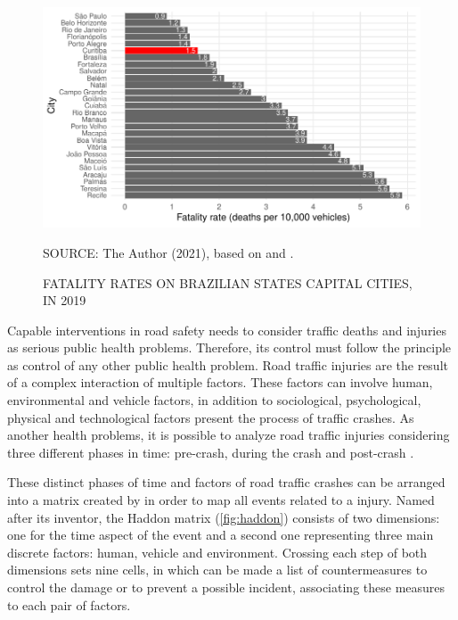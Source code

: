 \begin{figure}[!htbp]
    \centering\footnotesize
    \captionsetup{font=footnotesize}
    \caption{FATALITY RATES ON BRAZILIAN STATES CAPITAL CITIES, IN 2019}
    \includegraphics{fig/cap_fatal.pdf}
    \label{fig:cap_fatal}
    \par SOURCE: The Author (2021), based on \textcite{MinistryofHealth2020} and \textcite{DENATRAN2020}.
\end{figure} 

Capable interventions in road safety needs to consider traffic deaths and injuries as serious public health problems. Therefore, its control must follow the principle as control of any other public health problem. Road traffic injuries are the result of a complex interaction of multiple factors. These factors can involve human, environmental and vehicle factors, in addition to sociological, psychological, physical and technological factors present the process of traffic crashes. As another health problems, it is possible to analyze road traffic injuries considering three different phases in time: pre-crash, during the crash and post-crash \cite{Mohan2016}.

These distinct phases of time and factors of road traffic crashes can be arranged into a matrix created by \textcite{Haddon1980} in order to map all events related to a injury. Named after its inventor, the Haddon matrix (\autoref{fig:haddon}) consists of two dimensions: one for the time aspect of the event and a second one representing three main discrete factors: human, vehicle and environment. Crossing each step of both dimensions sets nine cells, in which can be made a list of countermeasures to control the damage or to prevent a possible incident, associating these measures to each pair of factors. 

